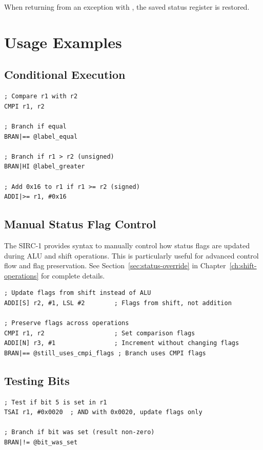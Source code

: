 When returning from an exception with , the saved status register is restored.

\section{Usage Examples}

\subsection{Conditional Execution}

\begin{lstlisting}
; Compare r1 with r2
CMPI r1, r2

; Branch if equal
BRAN|== @label_equal

; Branch if r1 > r2 (unsigned)
BRAN|HI @label_greater

; Add 0x16 to r1 if r1 >= r2 (signed)
ADDI|>= r1, #0x16
\end{lstlisting}

\subsection{Manual Status Flag Control}

The SIRC-1 provides syntax to manually control how status flags are updated during ALU and shift operations. This is
particularly useful for advanced control flow and flag preservation. See Section~\ref{sec:status-override} in
Chapter~\ref{ch:shift-operations} for complete details.

\begin{lstlisting}
; Update flags from shift instead of ALU
ADDI[S] r2, #1, LSL #2        ; Flags from shift, not addition

; Preserve flags across operations
CMPI r1, r2                   ; Set comparison flags
ADDI[N] r3, #1                ; Increment without changing flags
BRAN|== @still_uses_cmpi_flags ; Branch uses CMPI flags
\end{lstlisting}

\subsection{Testing Bits}

\begin{lstlisting}
; Test if bit 5 is set in r1
TSAI r1, #0x0020  ; AND with 0x0020, update flags only

; Branch if bit was set (result non-zero)
BRAN|!= @bit_was_set
\end{lstlisting}

